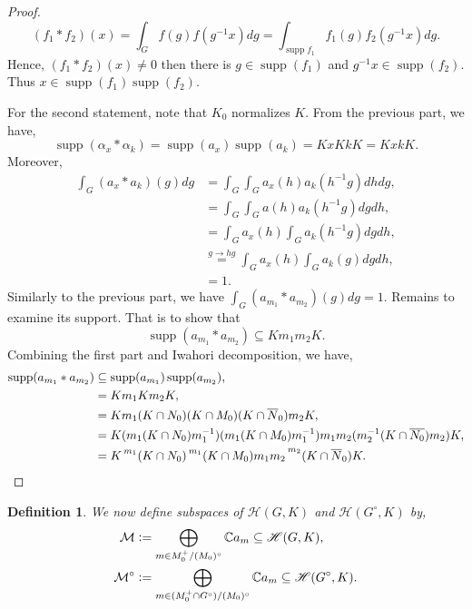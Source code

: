 \documentclass[8pt]{article}
\newtheorem{definition}{Definition}[section]
\DeclareMathOperator{\supp}{supp}
\newcommand{\defeq}{\vcentcolon=}
\newcommand{\C}[0]{\mathbb{C}}
\newcommand{\hecke}[0]{\mathscr{H}}
\begin{document}
\begin{proof}
  \begin{equation*}
    (f_1\ast f_2)(x) = \int_G f(g)f(g^{-1}x)dg = \int_{\supp f_1}f_1(g)f_2(g^{-1}x)dg.
  \end{equation*}
  Hence, $(f_1\ast f_2)(x)\not=0$ then there is $g\in \supp(f_1)$ and $g^{-1}x\in\supp(f_2)$. Thus $x\in\supp(f_1)\supp(f_2)$.
  \par For the second statement, note that $K_0$ normalizes $K$. From the previous part, we have, 
  \begin{equation*}
    \supp(\alpha_x\ast\alpha_k)= \supp(a_x)\supp(a_k) = KxKkK = KxkK.
  \end{equation*}
  Moreover, 
  \begin{align*}
    \int_G(a_x\ast a_k)(g)dg & = \int_G\int_Ga_x(h)a_k(h^{-1}g)dhdg,\\
    & = \int_G\int_Ga(h)a_k(h^{-1}g)dgdh,\\
    & = \int_Ga_x(h)\int_Ga_k(h^{-1}g)dgdh,\\
    & \stackrel{g\to hg}{=}\int_Ga_x(h)\int_Ga_k(g)dgdh,\\
    & = 1.
  \end{align*}
  Similarly to the previous part, we have $\int_G(a_{m_1}\ast a_{m_2})(g)dg = 1$. Remains to examine its support. That is to show that 
  \begin{equation*}
    \supp(a_{m_1}\ast a_{m_2}) \subseteq Km_1m_2K.
  \end{equation*}
  Combining the first part and Iwahori decomposition, we have,
  \begin{align*}
    \supp(a_{m_1}\ast a_{m_2}) & \subseteq \supp(a_{m_1})\supp(a_{m_2}),\\
    & = Km_1Km_2K,\\
    & = Km_1(K\cap N_0)(K\cap M_0)(K\cap \overline{N}_0)m_2K,\\
    & = K(m_1(K\cap N_0)m_1^{-1})(m_1 (K\cap M_0)m_1^{-1})m_1m_2(m_2^{-1}(K\cap\overline{N_0})m_2)K,\\
    & = K\prescript{m_1}{}{(K\cap N_0)}\prescript{m_1}{}{(K\cap M_0)}m_1m_2\prescript{m_2}{}{(K\cap \overline{N}_0)}K.
  \end{align*}
\end{proof}

\begin{definition}
  We now define subspaces of $\hecke(G,K)$ and $\hecke(G^\circ,K)$ by,
  \begin{align*}
    \mathcal{M} & \defeq \bigoplus_{m\in M_0^+/(M_0)^\circ}\C a_m\subseteq\hecke(G,K),\\
    \mathcal{M}^\circ & \defeq \bigoplus_{m\in (M_0^+\cap G^\circ)/(M_0)^\circ}\C a_m\subseteq\hecke(G^\circ,K).
  \end{align*}
\end{definition}
\end{document}
